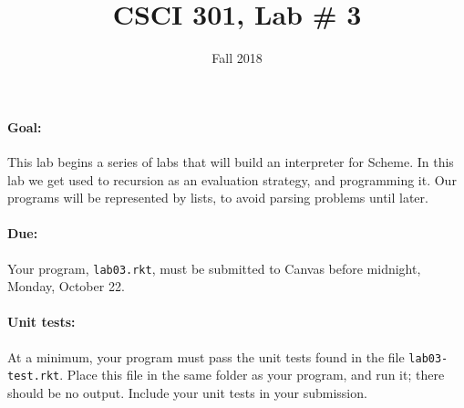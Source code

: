 \documentclass{article}
\title{CSCI 301, Lab \# 3}
\author{Fall 2018}
\date{}
\begin{document}
\maketitle


\paragraph{Goal:} This lab begins a series of labs that will
build an interpreter for Scheme.  In this lab we get used to
recursion as an evaluation strategy, and programming it.
Our programs will be represented by lists, to avoid parsing problems
until later.

\paragraph{Due:} Your program,  {\tt lab03.rkt}, must be submitted to
Canvas before midnight, Monday, October 22.

\paragraph{Unit tests:}
At a minimum, your program must pass the unit tests found in the
file {\tt lab03-test.rkt}.  Place this file in the same folder
as your program, and run it;  there should be no output.  Include
your unit tests in your submission.
\end{document}

